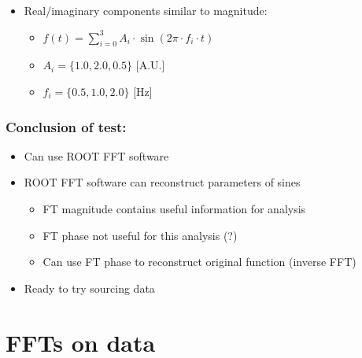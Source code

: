 \documentclass[bigger]{beamer}
\begin{document}
\begin{frame}
\begin{itemize}
\item Real/imaginary components similar to magnitude:
\label{sec-2-1-4-2}%
\begin{itemize}

\item \(f(t) = \sum_{i = 0}^3 A_{i} \cdot \sin (2\pi \cdot f_{i} \cdot t)\)
\label{sec-2-1-4-2-1}%

\item \(A_{i} = \{1.0, 2.0, 0.5\}\) [A.U.]
\label{sec-2-1-4-2-2}%

\item \(f_{i} = \{0.5, 1.0, 2.0\}\) [Hz]
\label{sec-2-1-4-2-3}%
\end{itemize} %
\end{itemize} %
\end{frame}
\begin{frame}
\frametitle{Conclusion of test:}
\label{sec-2-1-5}
\begin{itemize}

\item Can use ROOT FFT software
\label{sec-2-1-5-1}%

\item ROOT FFT software can reconstruct parameters of sines
\label{sec-2-1-5-2}%
\begin{itemize}

\item FT magnitude contains useful information for analysis
\label{sec-2-1-5-2-1}%

\item FT phase not useful for this analysis (?)
\label{sec-2-1-5-2-2}%

\item Can use FT phase to reconstruct original function (inverse FFT)
\label{sec-2-1-5-2-3}%
\end{itemize} %

\item Ready to try sourcing data
\label{sec-2-1-5-3}%
\end{itemize} %
\end{frame}
\section{FFTs on data}
\label{sec-3}
\end{document}

